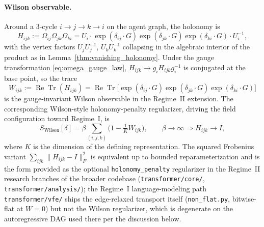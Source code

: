 \documentclass[11pt]{article}
\begin{document}
\paragraph{Wilson observable.} Around a 3-cycle $i\to j\to k\to i$ on the agent graph, the holonomy is
\begin{equation}
H_{ijk}
:= \Omega_{ij}\Omega_{jk}\Omega_{ki}
= U_i \cdot \exp(\delta_{ij}\cdot G) \exp(\delta_{jk}\cdot G) \exp(\delta_{ki}\cdot G) \cdot U_i^{-1},
\label{eq:discrete_holonomy}
\end{equation}
with the vertex factors $U_jU_j^{-1}$, $U_kU_k^{-1}$ collapsing in the algebraic interior of the product as in Lemma~\ref{thm:vanishing_holonomy}. Under the gauge transformation \eqref{eq:omega_gauge_law}, $H_{ijk} \to g_i H_{ijk} g_i^{-1}$ is conjugated at the base point, so the trace
\begin{equation}
W_{ijk} := \operatorname{Re}\operatorname{Tr}(H_{ijk})
= \operatorname{Re}\operatorname{Tr}\big[\exp(\delta_{ij}\cdot G) \exp(\delta_{jk}\cdot G) \exp(\delta_{ki}\cdot G)\big]
\label{eq:wilson_observable}
\end{equation}
is the gauge-invariant Wilson observable in the Regime~II extension. The corresponding Wilson-style holonomy-penalty regularizer, driving the field configuration toward Regime~I, is
\begin{equation}
S_{\mathrm{Wilson}}[\delta]
= \beta \sum_{(i,j,k)} \Big(1 - \tfrac{1}{K} W_{ijk}\Big),
\qquad
\beta \to \infty \Longrightarrow H_{ijk} \to I,
\label{eq:wilson_action}
\end{equation}
where $K$ is the dimension of the defining representation. The squared Frobenius variant $\sum_{ijk}\|H_{ijk} - I\|_F^2$ is equivalent up to bounded reparameterization and is the form provided as the optional \texttt{holonomy\_penalty} regularizer in the Regime~II research branches of the broader codebase (\texttt{transformer/core/}, \texttt{transformer/analysis/}); the Regime~I language-modeling path \texttt{transformer/vfe/} ships the edge-relaxed transport itself (\texttt{non\_flat.py}, bitwise-flat at $W=0$) but not the Wilson regularizer, which is degenerate on the autoregressive DAG used there per the discussion below.
\end{document}
